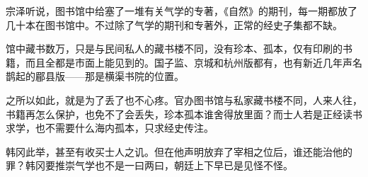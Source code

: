 宗泽听说，图书馆中给塞了一堆有关气学的专著，《自然》的期刊，每一期都放了几十本在图书馆中。不过除了气学的期刊和专著外，正常的经史子集都不缺。

馆中藏书数万，只是与民间私人的藏书楼不同，没有珍本、孤本，仅有印刷的书籍，而且全都是市面上能见到的。国子监、京城和杭州版都有，也有新近几年声名鹊起的郿县版——那是横渠书院的位置。

之所以如此，就是为了丢了也不心疼。官办图书馆与私家藏书楼不同，人来人往，书籍再怎么保护，也免不了会丢失，珍本孤本谁舍得放里面？而士人若是正经读书求学，也不需要什么海内孤本，只求经史传注。

韩冈此举，甚至有收买士人之讥。但在他声明放弃了宰相之位后，谁还能治他的罪？韩冈要推崇气学也不是一曰两曰，朝廷上下早已是见怪不怪。
